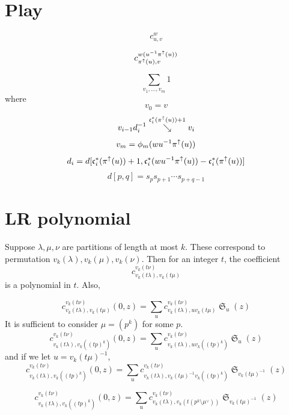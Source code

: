 \documentclass{amsart}
\theoremstyle{definition}
\theoremstyle{remark}
\numberwithin{equation}{section}
\newcommand{\downvar}[1]{\stackrel{#1}{\searrow}}
\DeclareMathOperator{\sch}{\mathfrak{S}}
\DeclareMathOperator{\qsch}{\widetilde{\mathfrak{S}}}
\newcommand{\code}{\mathfrak{c}}
\begin{document}


\section{Play}



$$c_{u,v}^w$$

$$c_{\pi^\uparrow(u),v}^{w(u^{-1}\pi^\uparrow(u))}$$

$$\sum_{v_1,\ldots,v_m}1$$
where
$$v_0=v$$
$$v_{i-1}d_i^{-1}\downvar{\code^*_i(\dom(u)) + 1} v_i$$ 
$$v_m = \phi_m(wu^{-1}\pi^\uparrow(u))$$
$$d_i = d[\code_i^*(\dom(u)) + 1, \code_i^*(wu^{-1}\dom(u)) - \code_i^*(\dom(u))]$$  
$$d[p,q]=s_ps_{p+1}\cdots s_{p+q-1}$$


\section{LR polynomial}

Suppose $\lambda,\mu,\nu$ are partitions of length at most $k$. These correspond to permutation $v_k(\lambda),v_k(\mu),v_k(\nu)$. Then for an integer $t$, the coefficient
$$c_{v_k(t\lambda),v_k(t\mu)}^{v_k(t\nu)}$$
is a polynomial in $t$. Also,

$$c_{v_k(t\lambda),v_k(t\mu)}^{v_k(t\nu)}(0,z) = \sum_{u}c_{v_k(t\lambda),uv_k(t\mu)}^{v_k(t\nu)}\sch_u(z)$$
It is sufficient to consider $\mu=(p^k)$ for some $p$.
$$c_{v_k(t\lambda),v_k((tp)^k)}^{v_k(t\nu)}(0,z) = \sum_{u}c_{v_k(t\lambda),uv_k((tp)^k)}^{v_k(t\nu)}\sch_u(z)$$
and if we let $u=v_k(t\mu)^{-1}$,
$$c_{v_k(t\lambda),v_k((tp)^k)}^{v_k(t\nu)}(0,z) = \sum_{u}c_{v_k(t\lambda),v_k(t\mu)^{-1}v_k((tp)^k)}^{v_k(t\nu)}\sch_{v_k(t\mu)^{-1}}(z)$$

$$c_{v_k(t\lambda),v_k((tp)^k)}^{v_k(t\nu)}(0,z) = \sum_{u}c_{v_k(t\lambda),v_k(t(p^k\setminus\mu^\vee))}^{v_k(t\nu)}\sch_{v_k(t\mu)^{-1}}(z)$$
\end{document}
